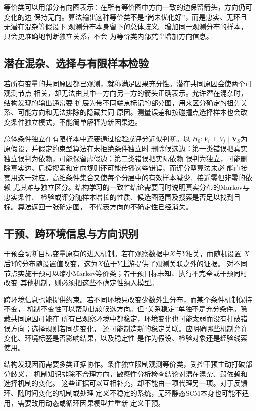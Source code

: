 等价类可以用部分有向图表示：在所有等价图中方向一致的边保留箭头，方向仍可变化的边
保持无向。算法输出这种等价类不是“尚未优化好”，而是忠实、无环且无潜在混杂等假设下
观测分布本身留下的总体歧义。增加同一观测分布的样本，只会更准确地判断独立关系，不会
为等价类内部凭空增加方向信息。

\subsection{潜在混杂、选择与有限样本检验}

若所有变量的共同原因都已观测，就称满足因果充分性。潜在共同原因会使两个可观测节点
相关，却无法由其中一方向另一方的箭头正确表示。允许潜在混杂时，结构发现的输出通常要
扩展为带不同端点标记的部分图，用来区分确定的祖先关系、可能方向和无法排除的隐藏共同
原因。测量误差和按碰撞点选择样本也会改变条件独立模式，不能简单解释为新因果边。

总体条件独立在有限样本中还要通过检验或评分近似判断。以
\(H_0:V_i\perp V_j\mid\bm V_S\)为原假设，并假定约束型算法在未拒绝条件独立时
删除候选边：第一类错误把真实独立误判为依赖，可能保留虚假边；第二类错误把实际依赖
误判为独立，可能删除真实边。后续搜索和定向规则还可能传播这些错误，而评分型算法未必
能直接套用这一对应。高维条件集合又使每个分层中的有效样本减少，接近零但非零的依赖
尤其难与独立区分。结构学习的一致性结论需要同时说明真实分布的Markov与忠实条件、
检验或评分随样本增长的性质、候选图范围及搜索是否足以找到目标。算法返回一张确定图，
不代表方向的不确定性已经消失。

\subsection{干预、跨环境信息与方向识别}

干预会切断目标变量原有的进入机制。若在观察数据中\(X\)与\(Y\)相关，而随机设置
\(X\)后\(Y\)的分布随设置值改变，这为\(X\)位于\(Y\)上游提供了观测关联之外的证据。
对不同节点实施干预可以缩小Markov等价类；若干预目标未知、执行不完全或干预同时改变
其他机制，则必须把这些不确定性纳入模型。

跨环境信息也能提供约束。若不同环境只改变少数外生分布，而某个条件机制保持不变，
机制不变性可以帮助比较候选方向。但“关系稳定”单独不是充分条件。隐藏共同原因可能在
所有已观察环境中都稳定，环境变化也可能太弱而没有打破错误方向；选择规则若同步变化，
还可能制造新的稳定关联。应明确哪些机制允许变化、环境标签是否影响结果，以及稳定性
是作为假设、检验对象还是经验线索使用。

结构发现因而需要多类证据协作。条件独立限制观测等价类，受控干预主动打破部分歧义，
机制知识排除不合理方向，敏感性分析检查结论对潜在混杂、弱依赖和选择机制的变化。
这些证据可以互相补充，却不能由一项代理另一项。对于反馈环、随时间变化的机制或处理
定义不稳定的系统，无环静态SCM本身也可能不适用，需要改用动态或循环因果模型并重新
定义干预。

